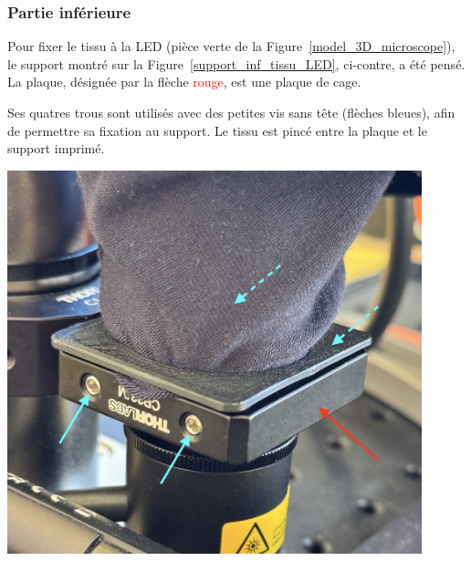 \subsubsection{Partie inférieure}
\begin{minipage}[c]{0.48\textwidth}
    Pour fixer le tissu à la LED (pièce \textcolor[RGB]{70, 170, 70}{verte} de la Figure~\ref{model_3D_microscope}), le support montré sur la Figure~\ref{support_inf_tissu_LED}, ci-contre, a été pensé. La plaque, désignée par la flèche \textcolor{red}{rouge}, est une plaque de cage.

    \vspace{1em}
    Ses quatres trous sont utilisés avec des petites vis sans tête (flèches \textcolor[RGB]{115, 210, 210}{bleues}), afin de permettre sa fixation au support. Le tissu est pincé entre la plaque et le support imprimé.
\end{minipage}\hfill
\begin{minipage}[c]{0.48\textwidth}
    \begin{center}
        \includegraphics[width=0.9\textwidth]{assets/figures/Protections_laser/Securite_mecanique/Protection_vers_microscope/support_inf_tissu_LED.jpeg}
    \end{center}
    \label{support_inf_tissu_LED}
\end{minipage}


